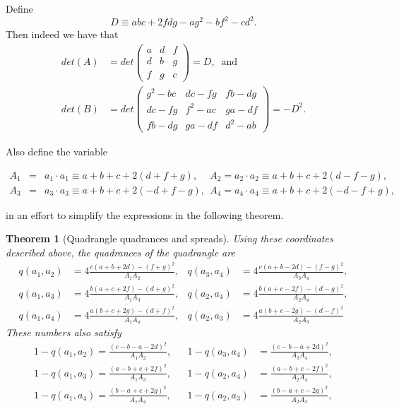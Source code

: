 \documentclass[11pt]{article}
\newtheorem{theorem}{Theorem}
\begin{document}
Define 
\begin{equation*}
D\equiv abc+2fdg-ag^{2}-bf^{2}-cd^{2}.
\end{equation*}%
Then indeed we have that 
\begin{align*}
det(A)& =det%
\begin{pmatrix}
a & d & f \\ 
d & b & g \\ 
f & g & c%
\end{pmatrix}%
=D,\;\;\text{and} \\
det(B)& =det%
\begin{pmatrix}
g^{2}-bc & dc-fg & fb-dg \\ 
dc-fg & f^{2}-ac & ga-df \\ 
fb-dg & ga-df & d^{2}-ab%
\end{pmatrix}%
=-D^{2}.
\end{align*}

Also define the variable

\begin{eqnarray*}
A_{1} &=&a_{1}\cdot a_{1}\equiv a+b+c+2\left( d+f+g\right) ,~\quad
A_{2}=a_{2}\cdot a_{2}\equiv a+b+c+2\left( d-f-g\right) ,~~ \\
A_{3} &=&a_{3}\cdot a_{3}\equiv a+b+c+2\left( -d+f-g\right)
,~~A_{4}=a_{4}\cdot a_{4}\equiv a+b+c+2(-d-f+g),
\end{eqnarray*}

in an effort to simplify the expressions in the following theorem.

\begin{theorem}[Quadrangle quadrances and spreads]
Using these coordinates described above, the quadrances of the quadrangle
are 
\begin{align*}
q(a_{1},a_{2})& =4\frac{c(a+b+2d)-(f+g)^{2}}{A_{1}A_{2}}, & q(a_{3},a_{4})&
=4\frac{c(a+b-2d)-(f-g)^{2}}{A_{3}A_{4}}, \\
q(a_{1},a_{3})& =4\frac{b(a+c+2f)-(d+g)^{2}}{A_{1}A_{3}}, & q(a_{2},a_{4})&
=4\frac{b(a+c-2f)-(d-g)^{2}}{A_{2}A_{4}}, \\
q(a_{1},a_{4})& =4\frac{a(b+c+2g)-(d+f)^{2}}{A_{1}A_{4}}, & q(a_{2},a_{3})&
=4\frac{a(b+c-2g)-(d-f)^{2}}{A_{2}A_{3}}
\end{align*}%
These numbers also satisfy 
\begin{align*}
1-q(a_{1},a_{2})=\frac{(c-b-a-2d)^{2}}{A_{1}A_{2}},& & 1-q(a_{3},a_{4})& =%
\frac{(c-b-a+2d)^{2}}{A_{3}A_{4}}, \\
1-q(a_{1},a_{3})=\frac{(a-b+c+2f)^{2}}{A_{1}A_{3}},& & 1-q(a_{2},a_{4})& =%
\frac{(a-b+c-2f)^{2}}{A_{2}A_{4}}, \\
1-q(a_{1},a_{4})=\frac{(b-a+c+2g)^{2}}{A_{1}A_{4}},& & 1-q(a_{2},a_{3})& =%
\frac{(b-a+c-2g)^{2}}{A_{2}A_{3}},
\end{align*}
\end{theorem}
\end{document}
